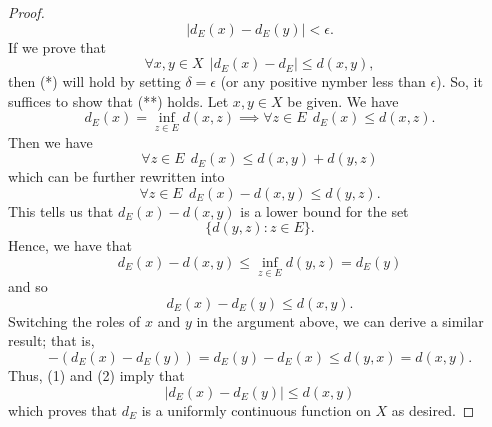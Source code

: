 \documentclass[a4paper]{article}
\begin{document}
\begin{proof}
            \[  | {d}_{E}(x) - {d}_{E}(y) |  < \epsilon. \tag{*} \]
            If we prove that 
            \[  \forall x, y \in X \ \ | {d}_{E}(x) - {d}_{E}  | \leq d(x,y), \tag{**}  \]
            then (*) will hold by setting \( \delta = \epsilon  \) (or any positive nymber less than \( \epsilon \)). So, it suffices to show that (**) holds. Let \( x,y \in X  \) be given. We have  
            \[  {d}_{E}(x) = \inf_{z \in E} d(x,z) \implies \forall z \in E \ \ {d}_{E}(x) \leq d(x,z).   \]
            Then we have 
            \[ \forall z \in E \ \ {d}_{E}(x) \leq d(x,y) + d(y,z) \]
            which can be further rewritten into
            \[ \forall z \in E  \ \   {d}_{E}(x) - d(x,y) \leq d(y,z). \]
            This tells us that \( {d}_{E}(x) - d(x,y) \) is a lower bound for the set
            \[  \{ d(y,z) : z \in E  \}.  \]
            Hence, we have that 
            \[  {d}_{E}(x) - d(x,y) \leq \inf_{z \in E} d(y,z) = {d}_{E}(y) \]
            and so 
            \[  {d}_{E}(x) - {d}_{E}(y) \leq d(x,y). \tag{1} \]
            Switching the roles of \( x  \) and \( y  \) in the argument above, we can derive a similar result; that is,
            \[ - ({d}_{E}(x) - {d}_{E}(y)) =   {d}_{E}(y) - {d}_{E}(x) \leq d(y,x) = d(x,y). \tag{2} \]
            Thus, (1) and (2) imply that 
            \[  | {d}_{E}(x) - {d}_{E}(y) |  \leq d(x,y) \]
            which proves that \( {d}_{E} \) is a uniformly continuous function on \( X  \) as desired.
\end{proof}
\end{document}
